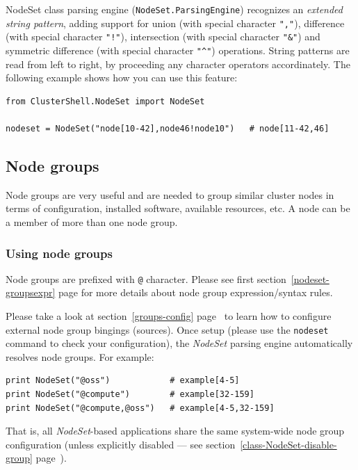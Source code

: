 \documentclass[english,a4paper]{csuserguide}
\newcommand{\NodeSet}{\textit{NodeSet}\xspace}
\newcommand{\nodeset}{\texttt{nodeset}\xspace}
\begin{document}
NodeSet class parsing engine (\lstinline+NodeSet.ParsingEngine+) recognizes an \textit{extended string pattern}, adding support for union (with special character \texttt{","}), difference (with special character \texttt{"!"}), intersection (with special character \texttt{"\&"}) and symmetric difference (with special character \verb+"^"+) operations. String patterns are read from left to right, by proceeding any character operators accordinately. The following example shows how you can use this feature:
\medskip
\begin{lstlisting}[breaklines=true, breakatwhitespace=true]
from ClusterShell.NodeSet import NodeSet

nodeset = NodeSet("node[10-42],node46!node10")   # node[11-42,46]
\end{lstlisting}

\pagebreak[4]

\subsection{Node groups}
\label{class-NodeSet-groups}

Node groups are very useful and are needed to group similar cluster nodes in terms of configuration, installed software, available resources, etc. A node can be a member of more than one node group.

\subsubsection{Using node groups}

Node groups are prefixed with \texttt{@} character. Please see first section~\ref{nodeset-groupsexpr} page \pageref{nodeset-groupsexpr} for more details about node group expression/syntax rules.

Please take a look at section~\ref{groups-config} page~\pageref{groups-config} to learn how to configure external node group bingings (sources). Once setup (please use the \nodeset command to check your configuration), the \NodeSet parsing engine automatically resolves node groups. For example:
\medskip
\begin{lstlisting}[breaklines=true, breakatwhitespace=true]
print NodeSet("@oss")            # example[4-5]
print NodeSet("@compute")        # example[32-159]
print NodeSet("@compute,@oss")   # example[4-5,32-159]
\end{lstlisting}

That is, all \NodeSet-based applications share the same system-wide node group configuration (unless explicitly disabled --- see section~\ref{class-NodeSet-disable-group} page~\pageref{class-NodeSet-disable-group}).
\end{document}
